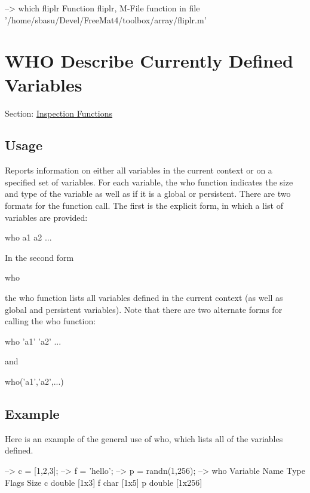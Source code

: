 \begin{DoxyVerbInclude}
--> which fliplr
Function fliplr, M-File function in file '/home/sbasu/Devel/FreeMat4/toolbox/array/fliplr.m'
\end{DoxyVerbInclude}
 \hypertarget{inspection_who}{}\section{W\-H\-O Describe Currently Defined Variables}\label{inspection_who}
Section\-: \hyperlink{sec_inspection}{Inspection Functions} \hypertarget{vtkwidgets_vtkxyplotwidget_Usage}{}\subsection{Usage}\label{vtkwidgets_vtkxyplotwidget_Usage}
Reports information on either all variables in the current context or on a specified set of variables. For each variable, the {\ttfamily who} function indicates the size and type of the variable as well as if it is a global or persistent. There are two formats for the function call. The first is the explicit form, in which a list of variables are provided\-: \begin{DoxyVerb}  who a1 a2 ...
\end{DoxyVerb}
 In the second form \begin{DoxyVerb}  who
\end{DoxyVerb}
 the {\ttfamily who} function lists all variables defined in the current context (as well as global and persistent variables). Note that there are two alternate forms for calling the {\ttfamily who} function\-: \begin{DoxyVerb}  who 'a1' 'a2' ...
\end{DoxyVerb}
 and \begin{DoxyVerb}  who('a1','a2',...)
\end{DoxyVerb}
 \hypertarget{variables_struct_Example}{}\subsection{Example}\label{variables_struct_Example}
Here is an example of the general use of {\ttfamily who}, which lists all of the variables defined.


\begin{DoxyVerbInclude}
--> c = [1,2,3];
--> f = 'hello';
--> p = randn(1,256);
--> who
  Variable Name       Type   Flags             Size
              c    double                    [1x3]
              f      char                    [1x5]
              p    double                    [1x256]
\end{DoxyVerbInclude}



